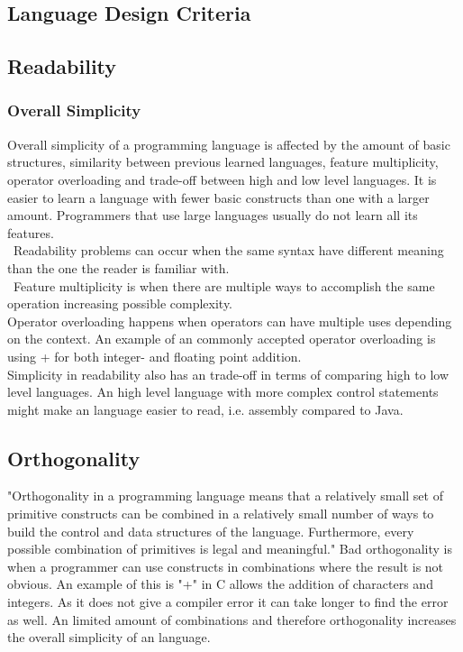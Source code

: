 \subsection{Language Design Criteria}
\label{language-design-criteria}
\label{design-criteria-theory}
\subsection*{Readability}
\subsubsection*{Overall Simplicity}
Overall simplicity of a programming language is affected by the amount of basic structures, similarity between previous learned languages, feature multiplicity, operator overloading and trade-off between high and low level languages.
It is easier to learn a language with fewer basic constructs than one with a larger amount. Programmers that use large languages usually do not learn all its features. \\\
Readability problems can occur when the same syntax have different meaning than the one the reader is familiar with.  \\\
Feature multiplicity is when there are multiple ways to accomplish the same operation increasing possible complexity. \\
Operator overloading happens when operators can have multiple uses depending on the context. An example of an commonly accepted operator overloading is using + for both integer- and floating point addition. \\
Simplicity in readability also has an trade-off in terms of comparing high to low level languages. An high level language with more complex control statements might make an language easier to read, i.e. assembly compared to Java.

\subsection*{Orthogonality}
"Orthogonality in a programming language means that a relatively small set
of primitive constructs can be combined in a relatively small number of ways
to build the control and data structures of the language. Furthermore, every possible combination of primitives is legal and meaningful."
Bad orthogonality is when a programmer can use constructs in combinations where the result is not obvious. An example of this is "+" in C allows the addition of characters and integers. As it does not give a compiler error it can take longer to find the error as well.
An limited amount of combinations and therefore orthogonality increases the overall simplicity of an language.

